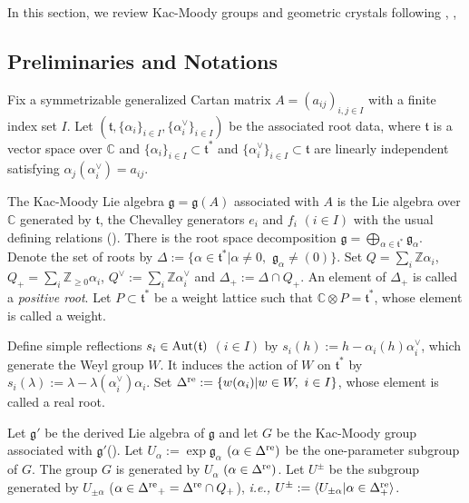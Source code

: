 In this section, 
we review Kac-Moody groups and geometric crystals
following 
\cite{PK}, \cite{Ku2}, \cite{BK}
\subsection{Preliminaries and Notations}
\label{KM}
Fix a symmetrizable generalized Cartan matrix
 $A=(a_{ij})_{i,j\in I}$ with a finite index set $I$.
Let $({\mathfrak t},\{{\alpha}_i\}_{i\in I},\{{\alpha}^\vee_i\}_{i\in I})$ 
be the associated
root data, where ${\mathfrak t}$ is a vector space 
over ${\mathbb C}$ and
$\{{\alpha}_i\}_{i\in I}\subset{\mathfrak t}^*$ and 
$\{{\alpha}^\vee_i\}_{i\in I}\subset{\mathfrak t}$
are linearly independent 
satisfying ${\alpha}_j({\alpha}^\vee_i)=a_{ij}$.

The Kac-Moody Lie algebra ${\mathfrak g}={\mathfrak g}(A)$ associated with $A$
is the Lie algebra over ${\mathbb C}$ generated by ${\mathfrak t}$, the 
Chevalley generators $e_i$ and $f_i$ $(i\in I)$
with the usual defining relations (\cite{Kac}).
There is the root space decomposition 
${\mathfrak g}=\bigoplus_{{\alpha}\in {\mathfrak t}^*}{\mathfrak g}_{\alpha}$.
Denote the set of roots by 
$\Delta:=\{{\alpha}\in {\mathfrak t}^*|{\alpha}\ne0,\,\,{\mathfrak g}_{\alpha}\ne(0)\}$.
Set $Q=\sum_i{\mathbb Z} {\alpha}_i$, $Q_+=\sum_i{\mathbb Z}_{\geq0} {\alpha}_i$,
$Q^\vee:=\sum_i{\mathbb Z} {\alpha}^\vee_i$
and $\Delta_+:=\Delta\cap Q_+$.
An element of $\Delta_+$ is called 
a {\it positive root}.
Let $P\subset {\mathfrak t}^*$ be a weight lattice such that 
${\mathbb C}{\otimes} P={\mathfrak t}^*$, whose element is called a
weight.

Define simple reflections $s_i\in{\rm Aut}({\mathfrak t})$ $(i\in I)$ by
$s_i(h):=h-{\alpha}_i(h){\alpha}^\vee_i$, which generate the Weyl group $W$.
It induces the action of $W$ on ${\mathfrak t}^*$ by
$s_i({\lambda}):={\lambda}-{\lambda}({\alpha}^\vee_i){\alpha}_i$.
Set ${\Delta^{\rm re}}:=\{w({\alpha}_i)|w\in W,\,\,i\in I\}$, whose element 
is called a real root.

Let ${\mathfrak g}'$ be the derived Lie algebra 
of ${\mathfrak g}$ and let 
$G$ be the Kac-Moody group associated 
with ${\mathfrak g}'$(\cite{PK}).
Let $U_{\alpha}:=\exp{\mathfrak g}_{\alpha}$ $({\alpha}\in {\Delta^{\rm re}})$
be the one-parameter subgroup of $G$.
The group $G$ is generated by $U_{\alpha}$ $({\alpha}\in {\Delta^{\rm re}})$.
Let $U^{\pm}$ be the subgroup generated by $U_{\pm{\alpha}}$
(${\alpha}\in {\Delta^{\rm re}}_+={\Delta^{\rm re}}\cap Q_+$), {\it i.e.,}
$U^{\pm}:={\langle} U_{\pm{\alpha}}|{\alpha}\in{\Delta}^{\rm re}_+{\rangle}$.

